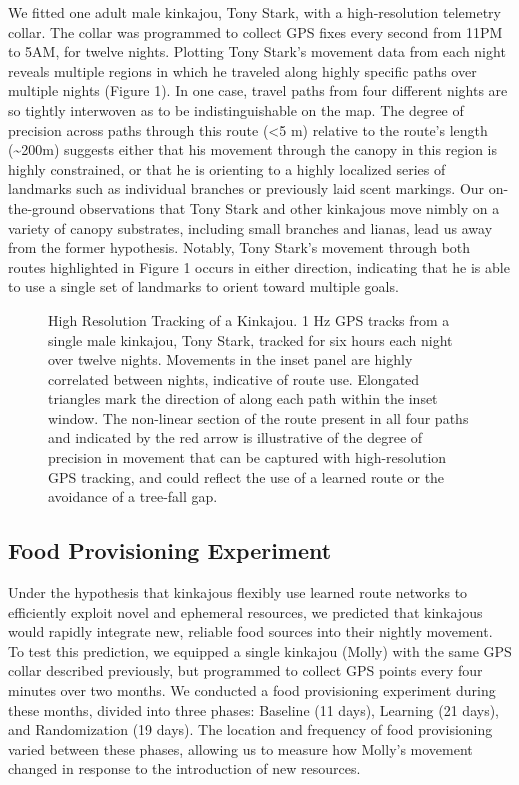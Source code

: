 \documentclass[twoside,12pt,final]{ucthesis-CA2012}
\begin{document}
\begin{ucmainmatter}
We fitted one adult male kinkajou, Tony Stark, with a high-resolution telemetry collar. The collar was programmed to collect GPS fixes every second from 11PM to 5AM, for twelve nights.
Plotting Tony Stark's movement data from each night reveals multiple regions in which he traveled along highly specific paths over multiple nights (Figure 1). In one case, travel paths from four different nights are so tightly interwoven as to be indistinguishable on the map. The degree of precision across paths through this route (\textless5 m) relative to the route's length (\textasciitilde200m) suggests either that his movement through the canopy in this region is highly constrained, or that he is orienting to a highly localized series of landmarks such as individual branches or previously laid scent markings. Our on-the-ground observations that Tony Stark and other kinkajous move nimbly on a variety of canopy substrates, including small branches and lianas, lead us away from the former hypothesis. Notably, Tony Stark's movement through both routes highlighted in Figure 1 occurs in either direction, indicating that he is able to use a single set of landmarks to orient toward multiple goals.
\begin{figure}[htbp]
\centering
\setlength{\fboxsep}{0pt}
\setlength{\fboxrule}{1pt}
\caption[High Resolution Tracking of a Kinkajou]{High Resolution Tracking of a Kinkajou. 1 Hz GPS tracks from a single male kinkajou, Tony Stark, tracked for six hours each night over twelve nights. Movements in the inset panel are highly correlated between nights, indicative of route use.  Elongated triangles mark the direction of along each path within the inset window. The non-linear section of the route present in all four paths and indicated by the red arrow is illustrative of the degree of precision in movement that can be captured with high-resolution GPS tracking, and could reflect the use of a learned route or the avoidance of a tree-fall gap.
\label{Figure 1. High resolution tracking of a kinkajou.}}
\end{figure}
\hypertarget{food-provisioning-experiment}{%
\subsection{Food Provisioning Experiment}\label{food-provisioning-experiment}}

Under the hypothesis that kinkajous flexibly use learned route networks to efficiently exploit novel and ephemeral resources, we predicted that kinkajous would rapidly integrate new, reliable food sources into their nightly movement. To test this prediction, we equipped a single kinkajou (Molly) with the same GPS collar described previously, but programmed to collect GPS points every four minutes over two months. We conducted a food provisioning experiment during these months, divided into three phases: Baseline (11 days), Learning (21 days), and Randomization (19 days). The location and frequency of food provisioning varied between these phases, allowing us to measure how Molly's movement changed in response to the introduction of new resources.


\end{ucmainmatter}
\end{document}
